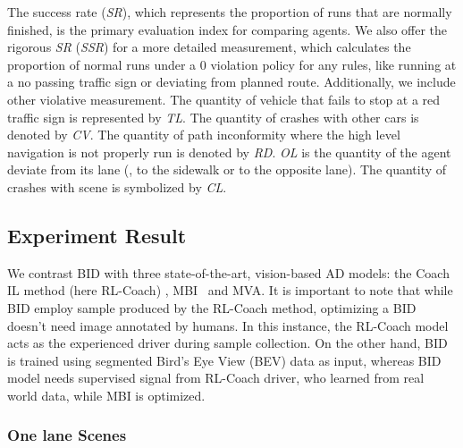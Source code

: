 The success rate (\emph{SR}), which represents the proportion of runs that are normally finished, is the primary evaluation index for comparing agents.
We also offer the rigorous \emph{SR} (\emph{SSR}) for a more detailed measurement, which calculates the proportion of normal runs under a 0 violation policy for any rules, like running at a no passing traffic sign or deviating from planned route.
Additionally, we include other violative measurement.
The quantity of vehicle that fails to stop at a red traffic sign is represented by \emph{TL}.
The quantity of crashes with other cars is denoted by \emph{CV}.
The quantity of path inconformity where the high level navigation is not properly run is denoted by \emph{RD}.
\emph{OL} is the quantity of the agent deviate from its lane ({\eg}, to the sidewalk or to the opposite lane).
The quantity of crashes with scene is symbolized by \emph{CL}.




\subsection{Experiment Result}
\label{sec:Results}
\hspace{1pc}We contrast BID with three state-of-the-art, vision-based AD models: the Coach IL method (here RL-Coach) \cite{Zhang:2021}, MBI~\cite{Hu:2022} and MVA\cite{xiao2023scaling}. 
It is important to note that while BID employ sample produced by the RL-Coach method, optimizing a BID doesn't need image annotated by humans. 
In this instance, the RL-Coach model acts as the experienced driver during sample collection.
On the other hand, BID is trained using segmented Bird's Eye View (BEV) data as input, whereas BID model needs supervised signal from RL-Coach driver, who learned from real world data, while MBI is optimized.


\subsubsection{One lane Scenes} \label{sec:small_town_results}

